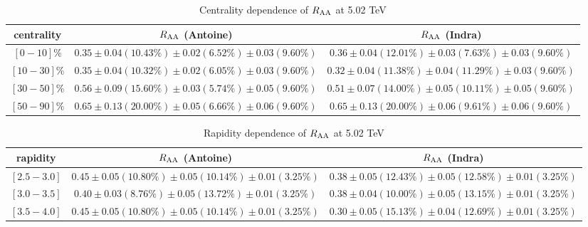 \begin{table}[htb]
\begin{center}
  {\scriptsize
    \begin{tabular} { c | c | c }
      \hline
      centrality   & $R_{\rm AA}$ (Antoine) &  $R_{\rm AA}$ (Indra) \\\hline
      $[0-10]\%$   & $0.35 \pm 0.04 (10.43\%) \pm 0.02 (6.52\%) \pm 0.03 (9.60\%)$ & $0.36 \pm 0.04 (12.01\%) \pm 0.03 (7.63\%) \pm 0.03 (9.60\%)$ \\
      $[10-30]\%$  & $0.35 \pm 0.04 (10.32\%) \pm 0.02 (6.05\%) \pm 0.03 (9.60\%)$ &$0.32 \pm 0.04 (11.38\%) \pm 0.04 (11.29\%) \pm 0.03 (9.60\%)$ \\
      $[30-50]\%$  & $0.56 \pm 0.09 (15.60\%) \pm 0.03 (5.74\%) \pm 0.05 (9.60\%)$ &$0.51 \pm 0.07 (14.00\%) \pm 0.05 (10.11\%) \pm 0.05 (9.60\%)$ \\
      $[50-90]\%$  & $0.65 \pm 0.13 (20.00\%) \pm 0.05 (6.66\%) \pm 0.06 (9.60\%)$ &$0.65 \pm 0.13 (20.00\%) \pm 0.06 (9.61\%) \pm 0.06 (9.60\%)$ \\\hline
    \end{tabular}
  }
    \caption{\label{raavaluescent} Centrality dependence of \ups $R_{\rm AA}$ at 5.02 TeV}
\end{center}
\end{table}


\begin{table}[htb]
\begin{center}
  {\scriptsize
    \begin{tabular} { c | c | c }
      \hline
      rapidity     & $R_{\rm AA}$  (Antoine) & $R_{\rm AA}$  (Indra)\\\hline
      $[2.5-3.0]$  & $0.45 \pm 0.05 (10.80\%) \pm 0.05 (10.14\%) \pm 0.01 (3.25\%)$ & $0.38 \pm 0.05 (12.43\%) \pm 0.05 (12.58\%) \pm 0.01 (3.25\%)$ \\
      $[3.0-3.5]$  & $0.40 \pm 0.03 (8.76\%) \pm 0.05 (13.72\%) \pm 0.01 (3.25\%)$ &$0.38 \pm 0.04 (10.00\%) \pm 0.05 (13.15\%) \pm 0.01 (3.25\%)$ \\
      $[3.5-4.0]$  & $0.45 \pm 0.05 (10.80\%) \pm 0.05 (10.14\%) \pm 0.01 (3.25\%)$ &$0.30 \pm 0.05 (15.13\%) \pm 0.04 (12.69\%) \pm 0.01 (3.25\%)$ \\\hline
    \end{tabular}
  }
    \caption{\label{raavaluesy} Rapidity dependence of \ups $R_{\rm AA}$ at 5.02 TeV}
\end{center}
\end{table}
